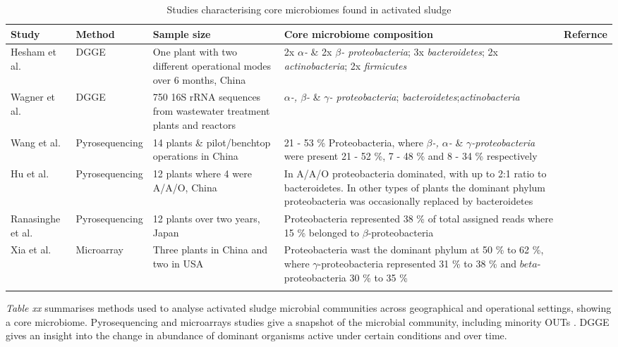 \documentclass[11pt]{article}
\begin{document}
\begin{sidewaystable}[!htbp]
\begin{tabular}{ | l | l | p{4.5cm} | p{7cm} | l | }
\hline
Study & Method & Sample size & Core microbiome composition & Refernce\\
\hline
Hesham et al. & DGGE & One plant with two different operational modes over 6 months, China & 2x \emph{$\alpha$-} \& 2x \emph{$\beta$- proteobacteria}; 3x \emph{bacteroidetes}; 2x \emph{actinobacteria}; 2x \emph{firmicutes} & \cite{Hesham_11} \\
\hline
Wagner et al. & DGGE & 750 16S rRNA sequences from wastewater treatment plants and reactors & \emph{$\alpha$-, $\beta$-} \& \emph{$\gamma$- proteobacteria}; \emph{bacteroidetes};\emph{actinobacteria} & \cite{Wagner_02} \\
\hline
Wang et al. & Pyrosequencing & 14 plants \& pilot/benchtop operations in China & 21 - 53 \% Proteobacteria, where \emph{$\beta$-, $\alpha$-} \& \emph{$\gamma$-proteobacteria} were present 21 - 52 \%, 7 - 48 \% and 8 - 34 \% respectively & \cite{wang2012pyrosequencing} \\
\hline
Hu et al. & Pyrosequencing & 12 plants where 4 were A/A/O, China & In A/A/O proteobacteria dominated, with up to 2:1 ratio to bacteroidetes. In other types of plants the dominant phylum proteobacteria was occasionally replaced by bacteroidetes & \cite{hu2012microbial} \\
\hline
Ranasinghe et al. & Pyrosequencing & 12 plants over two years, Japan & Proteobacteria represented 38 \% of total assigned reads where 15 \% belonged to $\beta$-proteobacteria & \cite{ranasinghe2012revealing} \\
\hline
Xia et al. & Microarray & Three plants in China and two in USA & Proteobacteria wast the dominant phylum at 50 \% to 62 \%, where $\gamma$-proteobacteria represented  31 \% to 38 \% and $beta$-proteobacteria 30 \% to 35 \% & \cite{xia2010bacterial} \\
\hline
 & & & & \\
\hline
\end{tabular}
\caption{Studies characterising core microbiomes found in activated sludge}
\end{sidewaystable}


\emph{Table xx} summarises methods used to analyse activated sludge microbial communities across geographical and operational settings, showing a core microbiome. Pyrosequencing and microarrays studies give a snapshot of the microbial community, including minority OUTs \cite{ranasinghe2012revealing}. DGGE gives an insight into the change in abundance of dominant organisms active under certain conditions and over time. 
\end{document}
